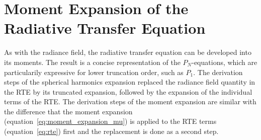 \section{Moment Expansion of the Radiative Transfer Equation}
\label{sec:da_moment_expansion_RTE}


As with the radiance field, the radiative transfer equation can be developed into its moments. The result is a concise representation of the $P_N$-equations, which are particularily expressive for lower truncation order, such as $P_1$. The derivation steps of the spherical harmonics expansion replaced the radiance field quantity in the RTE by its truncated expansion, followed by the expansion of the individual terms of the RTE. The derivation steps of the moment expansion are similar with the difference that the moment expansion (equation~\ref{eq:moment_expansion_mu}) is applied to the RTE terms (equation~\ref{eq:rte}) first and the replacement is done as a second step.

